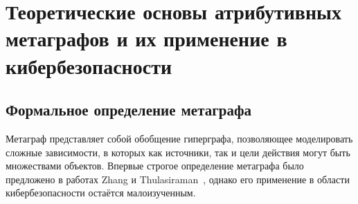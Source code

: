 \documentclass{article}
\begin{document}

\FloatBarrier



\chapter{Теоретические основы атрибутивных метаграфов и их применение в кибербезопасности}\label{ch:ch2}

\section{Формальное определение метаграфа}\label{sec:ch2/sec1}

Метаграф представляет собой обобщение гиперграфа, позволяющее моделировать сложные зависимости, в которых как источники, так и цели действия могут быть множествами объектов. Впервые строгое определение метаграфа было предложено в работах Zhang и Thulasiraman~\cite{Zhang2006}, однако его применение в области кибербезопасности остаётся малоизученным.
\end{document}
